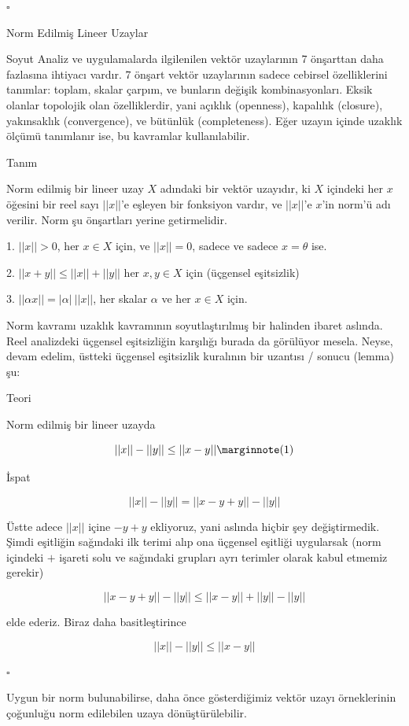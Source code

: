 \documentclass[12pt,fleqn]{article}\usepackage{../../common}
\begin{document}
$ \square $

Norm Edilmiş Lineer Uzaylar

Soyut Analiz ve uygulamalarda ilgilenilen vektör uzaylarının 7 önşarttan
daha fazlasına ihtiyacı vardır. 7 önşart vektör uzaylarının sadece cebirsel
özelliklerini tanımlar: toplam, skalar çarpım, ve bunların değişik
kombinasyonları. Eksik olanlar topolojik olan özelliklerdir, yani açıklık
(openness), kapalılık (closure), yakınsaklık (convergence), ve bütünlük
(completeness). Eğer uzayın içinde uzaklık ölçümü tanımlanır ise, bu
kavramlar kullanılabilir. 

Tanım

Norm edilmiş bir lineer uzay $X$ adındaki bir vektör uzayıdır, ki $X$
içindeki her $x$ öğesini bir reel sayı $||x||$'e eşleyen bir fonksiyon
vardır, ve $||x||$'e $x$'in norm'ü adı verilir. Norm şu önşartları yerine
getirmelidir. 

1. $||x|| > 0$, her $x \in X$ için, ve $||x|| = 0$, sadece ve sadece $x =
\theta$ ise. 

2. $||x+y|| \le ||x|| + ||y||$ her $x,y \in X$ için (üçgensel eşitsizlik) 

3. $||\alpha x|| = |\alpha| \ ||x||$, her skalar $\alpha$ ve her $x \in X$ için. 

Norm kavramı uzaklık kavramının soyutlaştırılmış bir halinden ibaret
aslında. Reel analizdeki üçgensel eşitsizliğin karşılığı burada da
görülüyor mesela. Neyse, devam edelim, üstteki üçgensel eşitsizlik
kuralının bir uzantısı / sonucu (lemma) şu:

Teori 

Norm edilmiş bir lineer uzayda 

$$ ||x|| - ||y|| \le ||x-y|| 
\mlabel{1}
$$

İspat

$$ ||x|| - ||y|| = ||x - y + y|| - ||y||$$

Üstte adece $||x||$ içine $-y+y$ ekliyoruz, yani aslında hiçbir şey
değiştirmedik. Şimdi eşitliğin sağındaki ilk terimi alıp ona üçgensel
eşitliği uygularsak (norm içindeki $+$ işareti solu ve sağındaki grupları
ayrı terimler olarak kabul etmemiz gerekir)

$$ ||x - y + y|| - ||y|| \le
||x - y || + ||y|| - ||y|| 
$$

elde ederiz. Biraz daha basitleştirince

$$ ||x|| - ||y||  \le ||x - y ||  $$

$\square$

Uygun bir norm bulunabilirse, daha önce gösterdiğimiz vektör uzayı
örneklerinin çoğunluğu norm edilebilen uzaya dönüştürülebilir.
\end{document}
